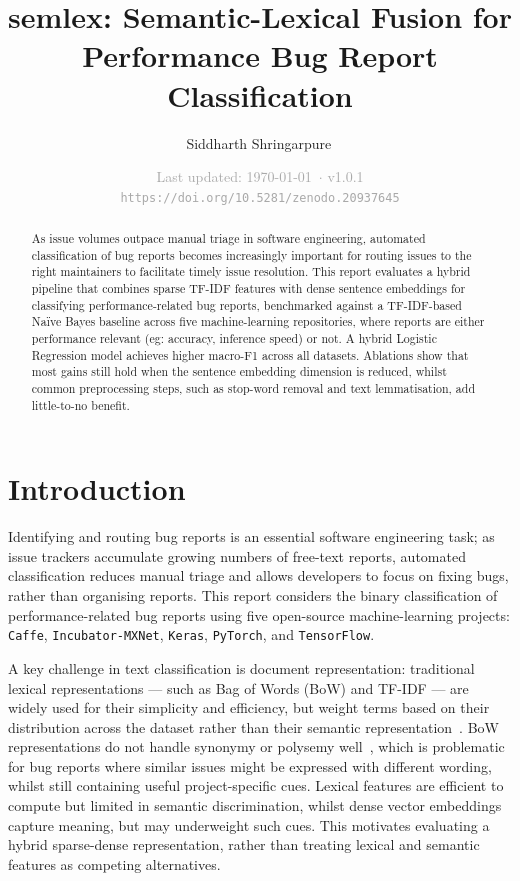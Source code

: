 \documentclass[10pt,a4paper]{article}
\title{semlex: Semantic-Lexical Fusion for Performance Bug Report Classification}
\author{Siddharth Shringarpure\,\orcidlink{0009-0002-7222-4946}}
\date{\textcolor{darkgray}{Last updated: \today\ $\cdot$ v1.0.1} \\[2pt]
\small \textcolor{darkgray}{\texttt{https://doi.org/10.5281/zenodo.20937645}}}
\begin{document}
\maketitle
\thispagestyle{plain}
\pagestyle{plain}

\begin{abstract}
    As issue volumes outpace manual triage in software engineering, automated classification of bug reports becomes increasingly important for routing issues to the right maintainers to facilitate timely issue resolution. This report evaluates a hybrid pipeline that combines sparse TF-IDF features with dense sentence embeddings for classifying performance-related bug reports, benchmarked against a TF-IDF-based Naïve Bayes baseline across five machine-learning repositories, where reports are either performance relevant (eg: accuracy, inference speed) or not. A hybrid Logistic Regression model achieves higher macro-F1 across all datasets. Ablations show that most gains still hold when the sentence embedding dimension is reduced, whilst common preprocessing steps, such as stop-word removal and text lemmatisation, add little-to-no benefit.
\end{abstract}

\section{Introduction}\label{introduction}
Identifying and routing bug reports is an essential software engineering task; as issue trackers accumulate growing numbers of free-text reports, automated classification reduces manual triage and allows developers to focus on fixing bugs, rather than organising reports. This report considers the binary classification of performance-related bug reports using five open-source machine-learning projects: \texttt{Caffe}, \texttt{Incubator-MXNet}, \texttt{Keras}, \texttt{PyTorch}, and \texttt{TensorFlow}.

A key challenge in text classification is document representation: traditional lexical representations --- such as Bag of Words (BoW) and TF-IDF --- are widely used for their simplicity and efficiency, but weight terms based on their distribution across the dataset rather than their semantic representation~\cite{sparck1972statistical, mourino-garcia_wikipedia-based_2018, lilleberg_support_2015}. BoW representations do not handle synonymy or polysemy well~\cite{mourino-garcia_wikipedia-based_2018}, which is problematic for bug reports where similar issues might be expressed with different wording, whilst still containing useful project-specific cues. Lexical features are efficient to compute but limited in semantic discrimination, whilst dense vector embeddings capture meaning, but may underweight such cues. This motivates evaluating a hybrid sparse-dense representation, rather than treating lexical and semantic features as competing alternatives. 
\end{document}

